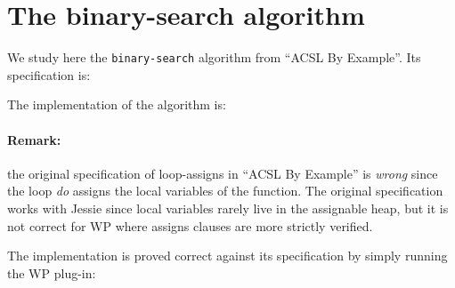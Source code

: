 \clearpage
\section{The \textsf{binary-search} algorithm}

We study here the \texttt{binary-search}
algorithm from ``ACSL By Example''. 
Its specification is:


The implementation of the algorithm is:


\paragraph{Remark:} the original specification of loop-assigns in ``ACSL By Example'' 
is \emph{wrong} since the loop \emph{do} assigns the local variables
of the function. The original specification works with \textsf{Jessie}
since local variables rarely live in the assignable heap, but it is
not correct for \textsf{WP} where assigns clauses are more strictly
verified.

The implementation is proved correct against its specification by
simply running the \textsf{WP} plug-in:

